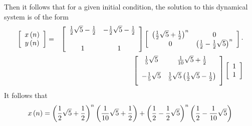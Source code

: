 \begin{solution}
Then it follows that for a given initial condition, the solution to this
dynamical system is of the form
\begin{eqnarray*}
\leftB
\begin{array}{c}
x\left( n\right) \\
y\left( n\right)
\end{array}
\rightB &=&\leftB
\begin{array}{cc}
\vspace{0.05in}\frac{1}{2}\sqrt{5}-\vspace{0.05in}\frac{1}{2} & -\vspace{0.05in}\frac{1}{2}\sqrt{5}-\vspace{0.05in}\frac{1}{2} \\
1 & 1
\end{array}
\rightB \leftB
\begin{array}{cc}
\left( \vspace{0.05in}\frac{1}{2}\sqrt{5}+\vspace{0.05in}\frac{1}{2}\right) ^{n} & 0 \\
0 & \left( \vspace{0.05in}\frac{1}{2}-\vspace{0.05in}\frac{1}{2}\sqrt{5}\right) ^{n}
\end{array}
\rightB \cdot \\
&&\leftB
\begin{array}{cc}
\vspace{0.05in}\frac{1}{5}\sqrt{5} & \vspace{0.05in}\frac{1}{10}\sqrt{5}+\vspace{0.05in}\frac{1}{2} \\
-\vspace{0.05in}\frac{1}{5}\sqrt{5} & \vspace{0.05in}\frac{1}{5}\sqrt{5}\left( \vspace{0.05in}\frac{1}{2}\sqrt{5}-\vspace{0.05in}\frac{1
}{2}\right)
\end{array}
\rightB \leftB
\begin{array}{r}
1 \\
1
\end{array}
\rightB
\end{eqnarray*}
It follows that
\begin{equation*}
x\left( n\right) =\left( \frac{1}{2}\sqrt{5}+\frac{1}{2}\right) ^{n}\left(
\frac{1}{10}\sqrt{5}+\frac{1}{2}\right) +\left( \frac{1}{2}-\frac{1}{2}\sqrt{%
5}\right) ^{n}\left( \frac{1}{2}-\frac{1}{10}\sqrt{5}\right)
\end{equation*}
\end{solution}

